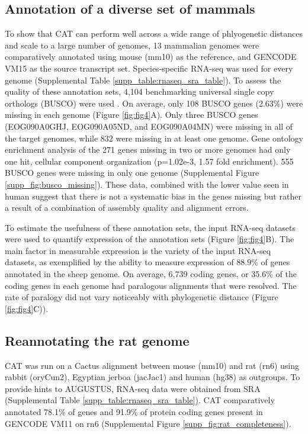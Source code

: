 \documentclass[fleqn,10pt]{wlscirep}
\begin{document}
\subsection*{Annotation of a diverse set of mammals}
	To show that CAT can perform well across a wide range of phlyogenetic distances and scale to a large number of genomes, 13 mammalian genomes were comparatively annotated using mouse (mm10) as the reference, and GENCODE VM15 as the source transcript set. Species-specific RNA-seq was used for every genome (Supplemental Table \ref{supp_table:rnaseq_sra_table}). To assess the quality of these annotation sets, 4,104 benchmarking universal single copy orthologs (BUSCO) were used \cite{simao2015busco}. On average, only 108 BUSCO genes (2.63\%) were missing in each genome  (Figure \ref{fig:fig4}A). Only three BUSCO genes (EOG090A0GHJ, EOG090A05ND, and EOG090A04MN) were missing in all of the target genomes, while 832 were missing in at least one genome. Gene ontology enrichment analysis of the 271 genes missing in two or more genomes had only one hit, cellular component organization (p=1.02e-3, 1.57 fold enrichment). 555 BUSCO genes were missing in only one genome (Supplemental Figure \ref{supp_fig:busco_missing}). These data, combined with the lower value seen in human suggest that there is not a systematic bias in the genes missing but rather a result of a combination of assembly quality and alignment errors.

To estimate the usefulness of these annotation sets, the input RNA-seq datasets were used to quantify expression of the annotation sets (Figure \ref{fig:fig4}B). The main factor in measurable expression is the variety of the input RNA-seq datasets, as exemplified by the ability to measure expression of 88.9\% of genes annotated in the sheep genome. On average, 6,739 coding genes, or 35.6\% of the coding genes in each genome had paralogous alignments that were resolved. The rate of paralogy did not vary noticeably with phylogenetic distance (Figure \ref{fig:fig4}C)).


\subsection*{Reannotating the rat genome}
	CAT was run on a Cactus alignment between mouse (mm10) and rat (rn6) using rabbit (oryCun2), Egyptian jerboa (jacJac1) and human (hg38) as outgroups. To provide hints to AUGUSTUS, RNA-seq data were obtained from SRA \cite{fushan2015gene,cortez2014origins,liu2016identification} (Supplemental Table \ref{supp_table:rnaseq_sra_table}). CAT comparatively annotated 78.1\% of genes and 91.9\% of protein coding genes present in GENCODE VM11 on rn6 (Supplemental Figure \ref{supp_fig:rat_completeness}). 
    
\end{document}
